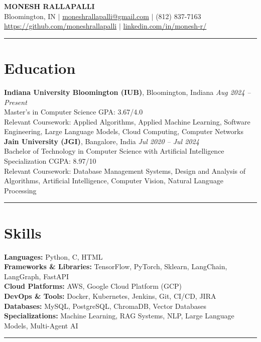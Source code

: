 \documentclass[a4paper,10pt]{article}
\newcommand{\sectionline}{\vspace{-0.2em}\noindent\rule{\linewidth}{0.6pt}\vspace{-0.5em}}
\begin{document}
\begin{center}
  \textbf{\LARGE MONESH RALLAPALLI} \\[2pt]
  Bloomington, IN \quad $\vert$ \quad \href{mailto:moneshrallapalli@gmail.com}{moneshrallapalli@gmail.com} \quad $\vert$ \quad (812) 837-7163 \\[1pt]
  \href{https://github.com/moneshrallapalli}{https://github.com/moneshrallapalli} \quad $\vert$ \quad \href{https://linkedin.com/in/monesh-r/}{linkedin.com/in/monesh-r/}
\end{center}

\vspace{-1.3em}
\sectionline
\section*{Education}
\textbf{Indiana University Bloomington (IUB)}, Bloomington, Indiana \hfill \textit{Aug 2024 -- Present}\\
Master's in Computer Science \hfill GPA: 3.67/4.0 \\
Relevant Coursework: Applied Algorithms, Applied Machine Learning, Software Engineering, Large Language Models, Cloud Computing, Computer Networks\\[0.1em]
\textbf{Jain University (JGI)}, Bangalore, India \hfill \textit{Jul 2020 -- Jul 2024}\\
Bachelor of Technology in Computer Science with Artificial Intelligence Specialization \hfill CGPA: 8.97/10 \\
Relevant Coursework: Database Management Systems, Design and Analysis of Algorithms, Artificial Intelligence, Computer Vision, Natural Language Processing

\sectionline
\section*{Skills}
\textbf{Languages:} Python, C, HTML \\
\textbf{Frameworks \& Libraries:} TensorFlow, PyTorch, Sklearn, LangChain, LangGraph, FastAPI \\
\textbf{Cloud Platforms:} AWS, Google Cloud Platform (GCP) \\
\textbf{DevOps \& Tools:} Docker, Kubernetes, Jenkins, Git, CI/CD, JIRA \\
\textbf{Databases:} MySQL, PostgreSQL, ChromaDB, Vector Databases \\
\textbf{Specializations:} Machine Learning, RAG Systems, NLP, Large Language Models, Multi-Agent AI \\
\sectionline
\end{document}
